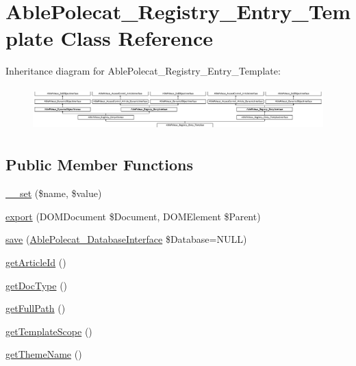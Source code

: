 \hypertarget{class_able_polecat___registry___entry___template}{}\section{Able\+Polecat\+\_\+\+Registry\+\_\+\+Entry\+\_\+\+Template Class Reference}
\label{class_able_polecat___registry___entry___template}
Inheritance diagram for Able\+Polecat\+\_\+\+Registry\+\_\+\+Entry\+\_\+\+Template\+:\begin{figure}[H]
\begin{center}
\leavevmode
\includegraphics[height=1.707317cm]{class_able_polecat___registry___entry___template}
\end{center}
\end{figure}
\subsection*{Public Member Functions}
\begin{DoxyCompactItemize}
\item 
\hyperlink{class_able_polecat___registry___entry___template_a83c2703c91959192f759992ad5640b67}{\+\_\+\+\_\+set} (\$name, \$value)
\item 
\hyperlink{class_able_polecat___registry___entry___template_a0a05b2e4b3a44390eeb042064e427b1a}{export} (D\+O\+M\+Document \$Document, D\+O\+M\+Element \$Parent)
\item 
\hyperlink{class_able_polecat___registry___entry___template_a999eef977eb899167ae02f83dd26a4ae}{save} (\hyperlink{interface_able_polecat___database_interface}{Able\+Polecat\+\_\+\+Database\+Interface} \$Database=N\+U\+L\+L)
\item 
\hyperlink{class_able_polecat___registry___entry___template_a169d60493254e284dc1c60ffe9253ed4}{get\+Article\+Id} ()
\item 
\hyperlink{class_able_polecat___registry___entry___template_a039f3de296e2836b8e47ed4382baa473}{get\+Doc\+Type} ()
\item 
\hyperlink{class_able_polecat___registry___entry___template_ac151a54c6136d7dee6bbe8d0e744bd32}{get\+Full\+Path} ()
\item 
\hyperlink{class_able_polecat___registry___entry___template_a1107269713ebd12a0dc5bcd12a16f8f0}{get\+Template\+Scope} ()
\item 
\hyperlink{class_able_polecat___registry___entry___template_aa146c4c73f2e0eabc0630e1a4464a774}{get\+Theme\+Name} ()
\end{DoxyCompactItemize}
